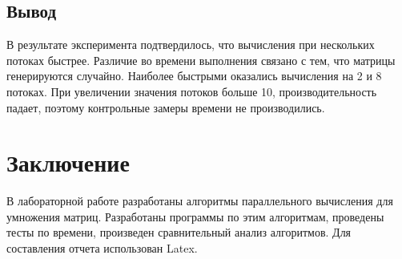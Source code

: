 \documentclass[12pt]{article}
\begin{document}
\subsection{Вывод}
В результате эксперимента подтвердилось, что вычисления при нескольких потоках быстрее. Различие во времени выполнения связано с тем, что матрицы генерируются случайно.  Наиболее быстрыми оказались вычисления на 2 и 8 потоках. При увеличении значения потоков больше 10, производительность падает, поэтому контрольные замеры времени не производились. 

\newpage
\section{Заключение}
В лабораторной работе разработаны алгоритмы параллельного вычисления для умножения матриц.  Разработаны программы по этим алгоритмам, проведены тесты по времени, произведен сравнительный анализ алгоритмов. Для составления отчета использован Latex.
\\
\end{document}
